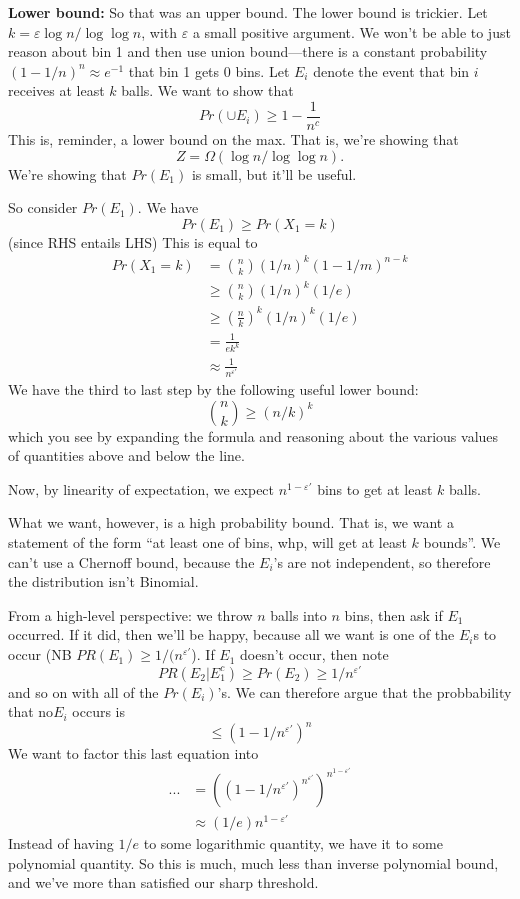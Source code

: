 \documentclass{article}
\begin{document}
\textbf{Lower bound:}
So that was an upper bound. The lower bound is trickier.
Let $k = \varepsilon \log n / \log\log n$, with $\varepsilon$ a small positive argument.
We won't be able to just reason about bin 1 and then use union bound---there is a constant probability $(1 - 1/n)^n \approx e^{-1}$ that bin 1 gets 0 bins.
Let $E_i$ denote the event that bin $i$ receives at least $k$ balls.
We want to show that
$$
Pr(\cup E_i) \geq 1 - \frac{1}{n^c}
$$
This is, reminder, a lower bound on the max.
That is, we're showing that
$$
Z = \Omega(\log n / \log\log n).
$$
We're showing that $Pr(E_1)$ is small, but it'll be useful.

So consider $Pr(E_1)$.
We have
$$
Pr(E_1) \geq Pr(X_1 = k)
$$
(since RHS entails LHS)
This is equal to 
\begin{align}
Pr(X_1 = k)
&= {n \choose k} 
\left(1/n \right)^k
(1 - 1/m)^{n-k}
\\
&\geq
{n\choose k} (1/n)^k
(1/e)
\\
&\geq \left(
	\frac{n}{k}
\right)^k
(1/n)^k
(1/e)
\\
&=
\frac{1}{e k^k}
\\
&\approx \frac{1}{n^{\varepsilon'}}
\end{align}
We have the third to last step by the following useful lower bound:
$$
{n\choose k} \geq (n/k)^k
$$
which you see by expanding the formula and reasoning about the various values of quantities above and below the line.

Now, by linearity of expectation, we expect
$n^{1-{\varepsilon'}}$ bins to get at least $k$ balls.

What we want, however, is a high probability bound.
That is, we want a statement of the form ``at least one of  bins, whp, will get at least $k$ bounds''.
We can't use a Chernoff bound, because the $E_i$'s are not independent, so therefore the distribution isn't Binomial.

From a high-level perspective: we throw $n$ balls into $n$ bins, then ask if $E_1$ occurred.
If it did, then we'll be happy, because all we want is one of the $E_i$s to occur (NB $PR(E_1) \geq 1 / (n^{\varepsilon'}$).
If $E_1$ doesn't occur, then note
$$
PR(E_2 | E_1^c) \geq Pr(E_2) \geq 1 / {n^{\varepsilon'}}
$$
and so on with all of the $Pr(E_i)$'s.
We can therefore argue that the probbability that no$ E_i$ occurs is
$$
\leq (1 - 1/n^{\varepsilon'})^n
$$
We want to factor this last equation into
\begin{align}
...&=
((1 - 1/n^{\varepsilon'}) ^ {n^{\varepsilon'}} ) ^ {n^{1 - \varepsilon'}}
\\
&\approx
(1/e) n^{1 - \varepsilon'}
\end{align}
Instead of having $1/e$ to some logarithmic quantity, we have it to some polynomial quantity.
So this is much, much less than inverse polynomial bound, and we've more than satisfied our sharp threshold.
\end{document}
